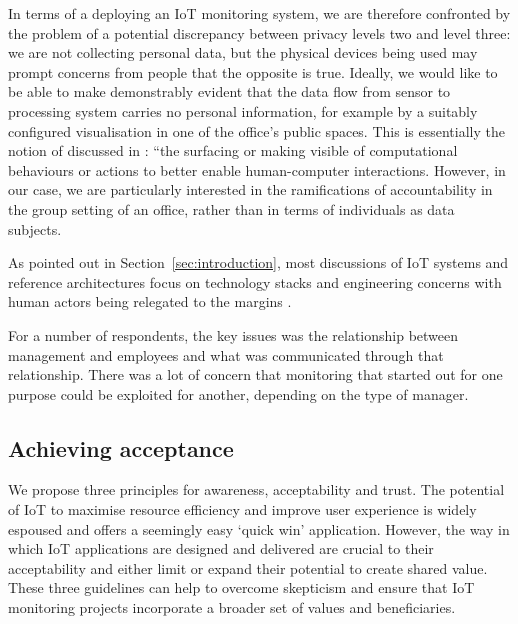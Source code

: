 In terms of a deploying an IoT monitoring system, we are therefore
confronted by the problem of a potential discrepancy between privacy
levels two and level three: we are not collecting personal data, but
the physical devices being used may prompt concerns from people that
the opposite is true. Ideally, we would like to be able to make demonstrably
evident that the data flow from sensor to processing system carries no
personal information, for example by a suitably configured
visualisation in one of the office's public spaces. This is essentially the notion of
 discussed in
\cite{Crabtree-2016-BAIT}: ``the surfacing or making visible of
computational behaviours or actions to better enable human-computer
interactions. However, in our case, we are particularly interested in
the ramifications of accountability in the group setting of an office,
rather than in terms of individuals as data subjects.



As pointed out in Section~\ref{sec:introduction}, most discussions of IoT
systems and reference architectures
\cite{Puschel-2016-WIAS,Heidt-2016-PGFT} focus on technology stacks
and engineering concerns with human actors being relegated to the
margins \cite{Shin-2014-ASTF}.


For a number of respondents, the key issues
was the relationship between management and employees and what was
communicated through that relationship. There was a lot of concern
that monitoring that started out for one purpose could be exploited
for another, depending on the type of manager. 


\subsection{Achieving acceptance}
\label{sec:achieving-acceptance}

We propose three principles for awareness, acceptability and trust. The potential of IoT to maximise
resource efficiency and improve user experience is widely espoused and
offers a seemingly easy ‘quick win’ application. However, the way in
which IoT applications are designed and delivered are crucial to their
acceptability and either limit or expand their potential to create shared value. These
three guidelines can help to overcome skepticism and ensure that IoT
monitoring projects incorporate a broader set of values and
beneficiaries. 


